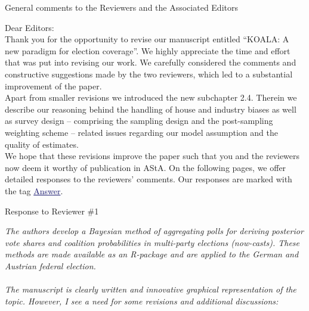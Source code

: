 \documentclass{scrartcl}
\newcommand{\blue}[1]{\textcolor{MidnightBlue}{\underline{\textcolor{MidnightBlue}{#1}}}}
\begin{document}
\begin{center}
\large General comments to the Reviewers and the Associated Editors
\end{center}

\vspace{5ex}

Dear Editors:
\\[2ex]
Thank you for the opportunity to revise our manuscript entitled ``KOALA: A new paradigm for election coverage''. We highly appreciate the time and effort that was put into revising our work. We carefully considered the comments and constructive suggestions made by the two reviewers, which led to
a substantial improvement of the paper.\\

Apart from smaller revisions we introduced the new subchapter 2.4. Therein we describe our reasoning behind the handling of house and industry biases as well as survey design -- comprising the sampling design and the post-sampling weighting scheme -- related issues regarding our model assumption and the quality of estimates.\\

We hope that these revisions improve the paper such that you and the reviewers now deem it worthy of publication in AStA. On the following pages, we offer detailed responses to the reviewers' comments. Our responses are marked with the tag \blue{Answer}.


\pagebreak
\begin{center}
\large Response to Reviewer \#1
\end{center}
\vspace{5ex}

\emph{
The authors develop a Bayesian method of aggregating polls for deriving posterior vote shares and coalition probabilities in multi-party elections (now-casts). These methods are made available as an R-package and are applied to the German and Austrian federal election.
\\ \\
The manuscript is clearly written and innovative graphical representation of the topic. However, I see a need for some revisions and additional discussions:
}
\end{document}
